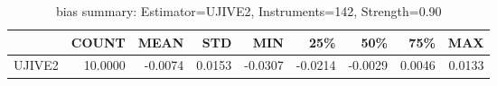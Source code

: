 \begin{table}[ht]
\centering
\caption{bias summary: Estimator=UJIVE2, Instruments=142, Strength=0.90}
\begin{tabular}{lrrrrrrrr}
\toprule
 & COUNT & MEAN & STD & MIN & 25\% & 50\% & 75\% & MAX \\
\midrule
UJIVE2 & 10.0000 & -0.0074 & 0.0153 & -0.0307 & -0.0214 & -0.0029 & 0.0046 & 0.0133 \\
\bottomrule
\end{tabular}
\end{table}
